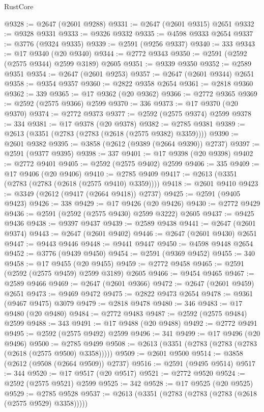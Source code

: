 \begin{lexlean}{RustCore}
\begin{coremodule}
@9328 := @2647 (@2601 @9288)
@9331 := @2647 (@2601 @9315) @2651
@9332 := @9328 @9331
@9333 := @9326 @9332
@9335 := @4598 @9333 @2654
@9337 := @3776 (@9324 @9335)
@9339 := @2591 (@9256 @9337)
@9340 := 333
@9343 := @17 @9340 (@20 @9340)
@9344 := @2772 @9343
@9350 := @2591 (@2592 (@2575 @9344) @2599 @3189) @2605
@9351 := @9339 @9350
@9352 := @2589 @9351
@9354 := @2647 (@2601 @9253)
@9357 := @2647 (@2601 @9344) @2651
@9358 := @9354 @9357
@9360 := @2822 @9358 @2654
@9361 := @2818 @9360
@9362 := 339
@9365 := @17 @9362 (@20 @9362)
@9366 := @2772 @9365
@9369 := @2592 (@2575 @9366) @2599
@9370 := 336
@9373 := @17 @9370 (@20 @9370)
@9374 := @2772 @9373
@9377 := @2592 (@2575 @9374) @2599
@9378 := 334
@9381 := @17 @9378 (@20 @9378)
@9382 := @2785 @9381
@9389 := @2613 (@3351 (@2783 (@2783 (@2618 (@2575 @9382) @3359))))
@9390 := @2601 @9382
@9395 := @3858 (@2612 (@9389 (@2664 @9390)) @2737)
@9397 := @2591 (@9377 @9395)
@9398 := 337
@9401 := @17 @9398 (@20 @9398)
@9402 := @2772 @9401
@9405 := @2592 (@2575 @9402) @2599
@9406 := 335
@9409 := @17 @9406 (@20 @9406)
@9410 := @2785 @9409
@9417 := @2613 (@3351 (@2783 (@2783 (@2618 (@2575 @9410) @3359))))
@9418 := @2601 @9410
@9423 := @3349 (@2612 (@9417 (@2664 @9418)) @2737)
@9425 := @2591 (@9405 @9423)
@9426 := 338
@9429 := @17 @9426 (@20 @9426)
@9430 := @2772 @9429
@9436 := @2591 (@2592 (@2575 @9430) @2599 @3222) @2605
@9437 := @9425 @9436
@9438 := @9397 @9437
@9439 := @2589 @9438
@9441 := @2647 (@2601 @9374)
@9443 := @2647 (@2601 @9402)
@9446 := @2647 (@2601 @9430) @2651
@9447 := @9443 @9446
@9448 := @9441 @9447
@9450 := @4598 @9448 @2654
@9452 := @3776 (@9439 @9450)
@9454 := @2591 (@9369 @9452)
@9455 := 340
@9458 := @17 @9455 (@20 @9455)
@9459 := @2772 @9458
@9465 := @2591 (@2592 (@2575 @9459) @2599 @3189) @2605
@9466 := @9454 @9465
@9467 := @2589 @9466
@9469 := @2647 (@2601 @9366)
@9472 := @2647 (@2601 @9459) @2651
@9473 := @9469 @9472
@9475 := @2822 @9473 @2654
@9478 := @9361 (@9467 @9475) @3079
@9479 := @2818 @9478
@9480 := 346
@9483 := @17 @9480 (@20 @9480)
@9484 := @2772 @9483
@9487 := @2592 (@2575 @9484) @2599
@9488 := 343
@9491 := @17 @9488 (@20 @9488)
@9492 := @2772 @9491
@9495 := @2592 (@2575 @9492) @2599
@9496 := 341
@9499 := @17 @9496 (@20 @9496)
@9500 := @2785 @9499
@9508 := @2613 (@3351 (@2783 (@2783 (@2783 (@2618 (@2575 @9500) @3358)))))
@9509 := @2601 @9500
@9514 := @3858 (@2612 (@9508 (@2664 @9509)) @2737)
@9516 := @2591 (@9495 @9514)
@9517 := 344
@9520 := @17 @9517 (@20 @9517)
@9521 := @2772 @9520
@9524 := @2592 (@2575 @9521) @2599
@9525 := 342
@9528 := @17 @9525 (@20 @9525)
@9529 := @2785 @9528
@9537 := @2613 (@3351 (@2783 (@2783 (@2783 (@2618 (@2575 @9529) @3358)))))

\end{coremodule}
\end{lexlean}
